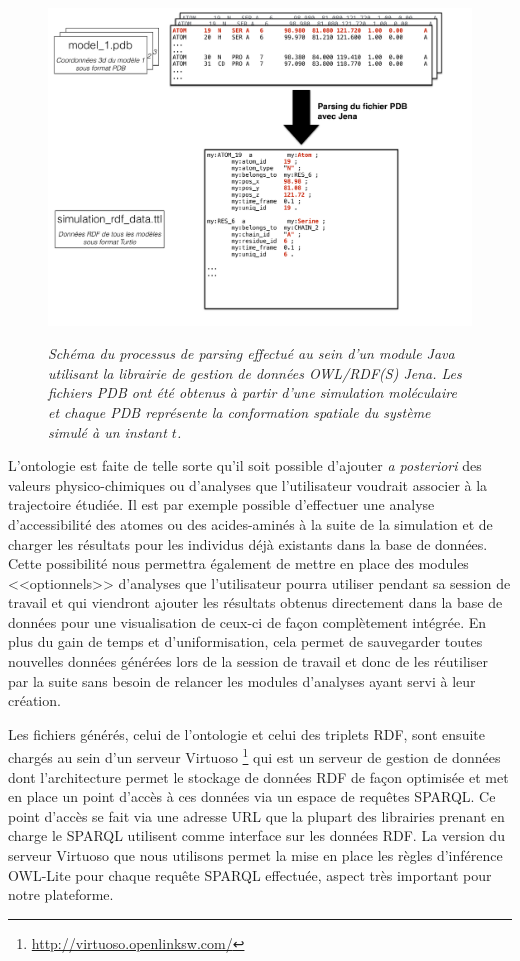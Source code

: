 \begin{figure}
  \centering
  {\includegraphics[width=.75\linewidth]{./figures/ch5/pdb_parsing_to_ttl.pdf}}
    \caption{{\it Schéma du processus de parsing effectué au sein d'un module Java utilisant la librairie de gestion de données OWL/RDF(S) Jena. Les fichiers PDB ont été obtenus à partir d'une simulation moléculaire et chaque PDB représente la conformation spatiale du système simulé à un instant $t$.}}
  \label{Fig:pdb_parsing_to_ttl}
  \hspace{0.3cm}
\end{figure}

L'ontologie est faite de telle sorte qu'il soit possible d'ajouter \textit{a posteriori} des valeurs physico-chimiques ou d'analyses que l'utilisateur voudrait associer à la trajectoire étudiée. Il est par exemple possible d'effectuer une analyse d'accessibilité des atomes ou des acides-aminés à la suite de la simulation et de charger les résultats pour les individus déjà existants dans la base de données. Cette possibilité nous permettra également de mettre en place des modules <<optionnels>> d'analyses que l'utilisateur pourra utiliser pendant sa session de travail et qui viendront ajouter les résultats obtenus directement dans la base de données pour une visualisation de ceux-ci de façon complètement intégrée. En plus du gain de temps et d'uniformisation, cela permet de sauvegarder toutes nouvelles données générées lors de la session de travail et donc de les réutiliser par la suite sans besoin de relancer les modules d'analyses ayant servi à leur création.

Les fichiers générés, celui de l'ontologie et celui des triplets RDF, sont ensuite chargés au sein d'un serveur Virtuoso \footnote{\url{http://virtuoso.openlinksw.com/}} qui est un serveur de gestion de données dont l'architecture permet le stockage de données RDF de façon optimisée et met en place un point d'accès à ces données via un espace de requêtes SPARQL. Ce point d'accès se fait via une adresse URL que la plupart des librairies prenant en charge le SPARQL utilisent comme interface sur les données RDF. La version du serveur Virtuoso que nous utilisons permet la mise en place les règles d'inférence OWL-Lite pour chaque requête SPARQL effectuée, aspect très important pour notre plateforme.

